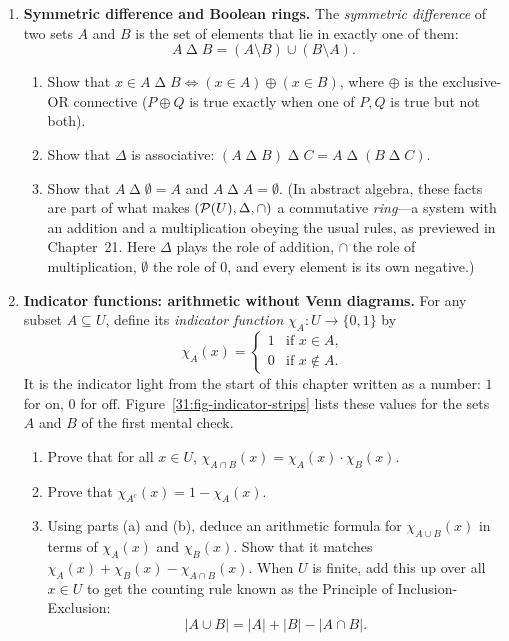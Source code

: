 \begin{enumerate}
  \item \textbf{Symmetric difference and Boolean rings.} The \emph{symmetric difference} of two sets $A$ and $B$ is the set of elements that lie in exactly one of them:
  \[
  A \mathbin{\Delta} B = (A \setminus B) \cup (B \setminus A).
  \]
  \begin{enumerate}[label=(\alph*)]
    \item Show that $x \in A \mathbin{\Delta} B \iff (x \in A) \oplus (x \in B)$, where $\oplus$ is the exclusive-OR connective ($P \oplus Q$ is true exactly when one of $P, Q$ is true but not both).
    \item Show that $\Delta$ is associative: $(A \mathbin{\Delta} B) \mathbin{\Delta} C = A \mathbin{\Delta} (B \mathbin{\Delta} C)$.
    \item Show that $A \mathbin{\Delta} \emptyset = A$ and $A \mathbin{\Delta} A = \emptyset$. (In abstract algebra, these facts are part of what makes $(\mathcal{P}(U), \Delta, \cap)$ a commutative \emph{ring}---a system with an addition and a multiplication obeying the usual rules, as previewed in Chapter~21. Here $\Delta$ plays the role of addition, $\cap$ the role of multiplication, $\emptyset$ the role of $0$, and every element is its own negative.)
  \end{enumerate}

  \item \textbf{Indicator functions: arithmetic without Venn diagrams.} For any subset $A \subseteq U$, define its \emph{indicator function} $\chi_A : U \to \{0, 1\}$ by
  \[
  \chi_A(x) =
  \begin{cases}
    1 & \text{if } x \in A, \\
    0 & \text{if } x \notin A.
  \end{cases}
  \]
  It is the indicator light from the start of this chapter written as a number: $1$ for on, $0$ for off. Figure~\ref{31:fig-indicator-strips} lists these values for the sets $A$ and $B$ of the first mental check.
  \begin{enumerate}[label=(\alph*)]
    \item Prove that for all $x \in U$, $\chi_{A \cap B}(x) = \chi_A(x) \cdot \chi_B(x)$.
    \item Prove that $\chi_{A^c}(x) = 1 - \chi_A(x)$.
    \item Using parts (a) and (b), deduce an arithmetic formula for $\chi_{A \cup B}(x)$ in terms of $\chi_A(x)$ and $\chi_B(x)$. Show that it matches $\chi_A(x) + \chi_B(x) - \chi_{A \cap B}(x)$. When $U$ is finite, add this up over all $x \in U$ to get the counting rule known as the Principle of Inclusion-Exclusion:
    \[
    |A \cup B| = |A| + |B| - |A \cap B|.
    \]
  \end{enumerate}
\end{enumerate}

